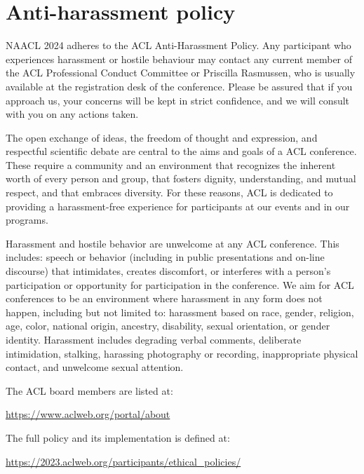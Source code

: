 \chapter[Anti-harassment policy]{Anti-harassment policy}
\thispagestyle{emptyheader}
\setheaders{}{}

NAACL 2024 adheres to the ACL Anti-Harassment Policy. Any participant who experiences harassment or hostile behaviour may contact any current member of the ACL Professional Conduct Committee or Priscilla Rasmussen, who is usually available at the registration desk of the conference. Please be assured that if you approach us, your concerns will be kept in strict confidence, and we will consult with you on any actions taken.

The open exchange of ideas, the freedom of thought and expression, and respectful scientific debate are central to the aims and goals of a ACL conference. These require a community and an environment that recognizes the inherent worth of every person and group, that fosters dignity, understanding, and mutual respect, and that embraces diversity. For these reasons, ACL is dedicated to providing a harassment-free experience for participants at our events and in our programs.

Harassment and hostile behavior are unwelcome at any ACL conference. This includes: speech or behavior (including in public presentations and on-line discourse) that intimidates, creates discomfort, or interferes with a person's participation or opportunity for participation in the conference. We aim for ACL conferences to be an environment where harassment in any form does not happen, including but not limited to: harassment based on race, gender, religion, age, color, national origin, ancestry, disability, sexual orientation, or gender identity. Harassment includes degrading verbal comments, deliberate intimidation,
stalking, harassing photography or recording, inappropriate physical contact, and unwelcome sexual attention.

The ACL board members are listed at:

\url{https://www.aclweb.org/portal/about}

The full policy and its implementation is defined at:

\url{https://2023.aclweb.org/participants/ethical_policies/}

